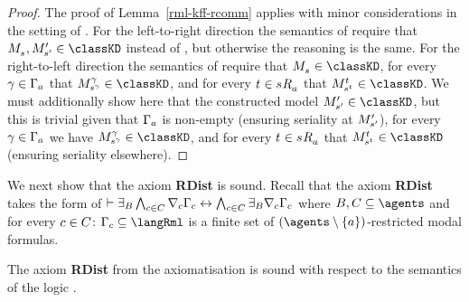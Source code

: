 \begin{proof}
The proof of Lemma~\ref{rml-kff-rcomm} applies with minor considerations in the setting of \logicRmlKD{}.
For the left-to-right direction the semantics of \logicRmlKD{} require that $\kPModel{\kStateS}, \kPModelP{\kStateSP} \in \classKD$ instead of \classKFF{}, but otherwise the reasoning is the same.
For the right-to-left direction the semantics of \logicRmlKD{} require that $\kPModel{\kStateS} \in \classKD$, for every $\gamma \in \Gamma_a$ that $\kPModel[\gamma]{\kStateS[\gamma]} \in \classKD$, and for every $\kStateT \in \kSuccessorsA{\kStateS}$ that $\kPModel[\kStateT]{\kStateS[\kStateT]} \in \classKD$.
We must additionally show here that the constructed model $\kPModelP{\kStateSP} \in \classKD$, but this is trivial given that $\Gamma_a$ is non-empty (ensuring seriality at ${M^{\prime}_{{s}^{\prime}}}$), for every $\gamma \in \Gamma_a$ we have $\kPModel[\gamma]{\kStateS[\gamma]} \in \classKD$, and for every $\kStateT \in \kSuccessorsA{\kStateS}$ that $\kPModel[\kStateT]{\kStateS[\kStateT]} \in \classKD$ (ensuring seriality elsewhere).
\end{proof}

We next show that the axiom {\bf RDist} is sound.
Recall that the axiom {\bf RDist} takes the form of $\vdash {\exists_{B}} \bigwedge_{c \in C} \nabla_{c} \Gamma_c \leftrightarrow \bigwedge_{c \in C} {\exists_{B}} \nabla_{c} \Gamma_c$ where $\agentsB, \agentsC \subseteq \agents$ and for every $c \in C$: $\Gamma_\agentC \subseteq \langRml$ is a finite set of $(\agents \setminus \{\agentA\})$-restricted modal formulas.

\begin{lemma}\label{rml-kff-rdist}
The axiom {\bf RDist} from the axiomatisation \axiomRmlKFF{} is sound with respect to the semantics of the logic \logicRmlKFF{}.
\end{lemma}

